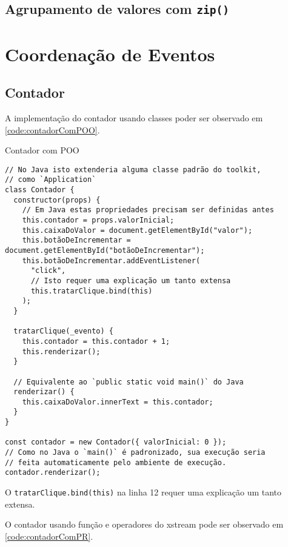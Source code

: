 \subsection{Agrupamento de valores com \texttt{zip()}}
\label{sec:orgc0ba433}

\section{Coordenação de Eventos}
\label{sec:org2f27f28}
\subsection{Contador}
\label{sec:orgb95d1c9}

A implementação do contador usando classes poder ser observado em
\ref{code:contadorComPOO}.

\begin{listing}[htbp]
\caption{\label{code:contadorComPOO}Contador com POO}
\begin{verbatim}
// No Java isto extenderia alguma classe padrão do toolkit,
// como `Application`
class Contador {
  constructor(props) {
    // Em Java estas propriedades precisam ser definidas antes
    this.contador = props.valorInicial;
    this.caixaDoValor = document.getElementById("valor");
    this.botãoDeIncrementar = document.getElementById("botãoDeIncrementar");
    this.botãoDeIncrementar.addEventListener(
      "click",
      // Isto requer uma explicação um tanto extensa
      this.tratarClique.bind(this)
    );
  }

  tratarClique(_evento) {
    this.contador = this.contador + 1;
    this.renderizar();
  }

  // Equivalente ao `public static void main()` do Java
  renderizar() {
    this.caixaDoValor.innerText = this.contador;
  }
}

const contador = new Contador({ valorInicial: 0 });
// Como no Java o `main()` é padronizado, sua execução seria
// feita automaticamente pelo ambiente de execução.
contador.renderizar();
\end{verbatim}
\end{listing}

O \texttt{tratarClique.bind(this)} na linha 12 requer uma explicação um tanto
extensa.

O contador usando função e operadores do xstream pode ser observado em
\ref{code:contadorComPR}.

